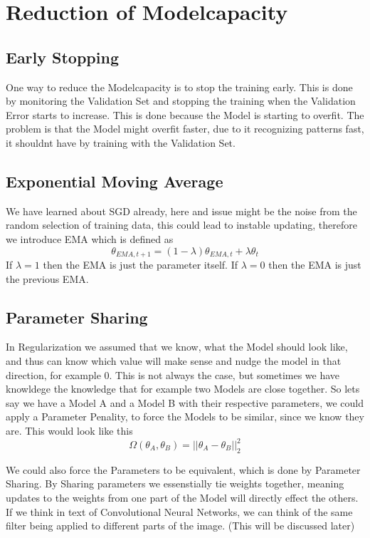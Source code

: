 \documentclass[a4paper]{article}
\begin{document}
\section{Reduction of Modelcapacity}
\subsection{Early Stopping}
One way to reduce the Modelcapacity is to stop the training early. This is done by monitoring the Validation Set and stopping the training when the Validation Error starts to increase. This is done because the Model is starting to overfit. The problem is that the Model might overfit faster, due to it recognizing patterns fast, it shouldnt have by training with the Validation Set.

\subsection{Exponential Moving Average}
We have learned about SGD already, here and issue might be the noise from the random selection of training data, this could lead to instable updating, therefore we introduce EMA which is defined as $$\theta_{EMA,t+1} = (1-\lambda) \theta_{EMA,t} + \lambda \theta_{t}$$ If $\lambda = 1$ then the EMA is just the parameter itself. If $\lambda = 0$ then the EMA is just the previous EMA. 

\subsection{Parameter Sharing}
In Regularization we assumed that we know, what the Model should look like, and thus can know which value will make sense and nudge the model in that direction, for example 0. This is not always the case, but sometimes we have knowldege the knowledge that for example two Models are close together. 
So lets say we have a Model A and a Model B with their respective parameters, we could apply a Parameter Penality, to force the Models to be similar, since we know they are. This would look like this $$ \Omega (\theta_{A}, \theta_{B}) = ||\theta_{A} - \theta_{B}||^{2}_{2} $$ 

We could also force the Parameters to be equivalent, which is done by Parameter Sharing. By Sharing parameters we essenstially tie weights together, meaning updates to the weights from one part of the Model will directly effect the others. If we think in text of Convolutional Neural Networks, we can think of the same filter being applied to different parts of the image. (This will be discussed later)
\end{document}
